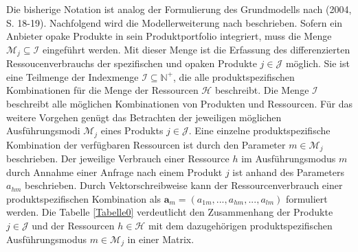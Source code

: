 Die bisherige Notation ist analog der Formulierung des Grundmodells nach \citeauthor{talluri2004revenue} (2004, S. 18-19). Nachfolgend wird die Modellerweiterung nach \cite{gonsch2013using} beschrieben. Sofern ein Anbieter opake Produkte in sein Produktportfolio integriert, muss die Menge $\mathcal{M}_{j}\subseteq\mathcal{I}$ eingeführt werden. Mit dieser Menge ist die Erfassung des differenzierten Ressoucenverbrauchs der spezifischen und opaken Produkte $j\in\mathcal{J}$ möglich. Sie ist eine Teilmenge der Indexmenge $\mathcal{I}\subseteq\mathbb{N}^{+}$, die alle produktspezifischen Kombinationen für die Menge der Ressourcen $\mathcal{H}$ beschreibt. Die Menge $\mathcal{I}$ beschreibt alle möglichen Kombinationen von Produkten und Ressourcen. Für das weitere Vorgehen genügt das Betrachten der jeweiligen möglichen Ausführungsmodi $\mathcal{M}_{j}$ eines Produkts $j\in\mathcal{J}$. Eine einzelne produktspezifische Kombination der verfügbaren Ressourcen ist durch den Parameter $m\in\mathcal{M}_{j}$ beschrieben. Der jeweilige Verbrauch einer Ressource $h$ im Ausführungsmodus $m$ durch Annahme einer Anfrage nach einem Produkt $j$ ist anhand des Parameters $a_{hm}$ beschrieben. Durch Vektorschreibweise kann der Ressourcenverbrauch einer produktspezifischen Kombination als $\textbf{a}_{m}=(a_{1m},...,a_{hm},...,a_{lm})$ formuliert werden. Die Tabelle \ref{Tabelle0} verdeutlicht den Zusammenhang der Produkte $j\in\mathcal{J}$ und der Ressourcen $h\in\mathcal{H}$ mit dem dazugehörigen produktspezifischen Ausführungsmodus $m\in\mathcal{M}_{j}$ in einer Matrix. \\

